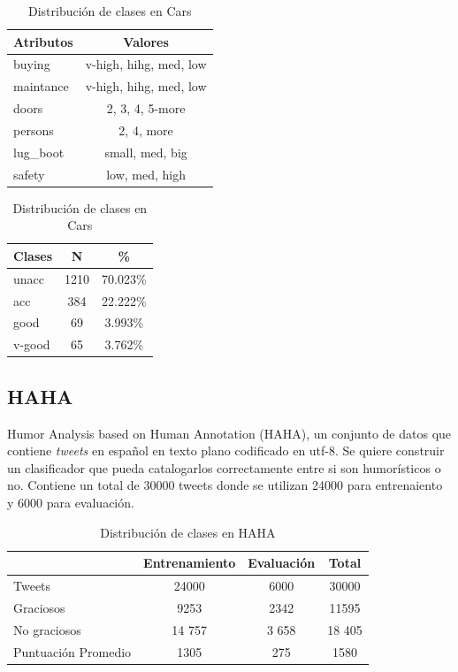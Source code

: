\begin{table}[ht]
    \centering
    \parbox{.45\linewidth}{
    \begin{tabular} { |l|c| }
        \hline
        Atributos & Valores \\
        \hline
        \hline
        buying & v-high, hihg, med, low \\
        \hline
        maintance &  v-high, hihg, med, low\\
        \hline
        doors & 2, 3, 4, 5-more\\
        \hline
        persons & 2, 4, more\\
        \hline
        lug\_boot & small, med, big\\
        \hline
        safety & low, med, high\\
        \hline
    \end{tabular}
    \caption{Tipos de Atributos en Cars}
    \label{implementation:table:cars:attributes}
    }
    \qquad
    \parbox[t]{.45\linewidth}{
    \begin{tabular} {|l|c|c|}
        \hline
        Clases & N & \% \\
        \hline
        \hline
        unacc & 1210 & 70.023\%\\
        \hline
        acc & 384 & 22.222\%\\
        \hline
        good & 69 & 3.993\%\\
        \hline
        v-good & 65 & 3.762\%\\
        \hline
    \end{tabular}
    \caption{Distribuci\'on de clases en Cars}
    \label{implementation:table:cars:classes}
    }
\end{table}

\subsection{HAHA}
Humor Analysis based on Human Annotation (HAHA), un conjunto de datos que contiene \textit{tweets} en espa\~nol en texto plano codificado en utf-8. Se quiere construir un clasificador que pueda catalogarlos correctamente entre si son humor\'isticos o no. Contiene un total de 30000 tweets donde se utilizan 24000 para entrenaiento y 6000 para evaluaci\'on.

\begin{table}[ht]
    \centering
    \begin{tabular} {|l||c|c|c|}
        \hline
        & Entrenamiento & Evaluaci\'on & Total \\
        \hline
        \hline
        Tweets & 24000 & 6000 & $30000$\\
        \hline
        Graciosos & 9253 & 2342 & 11595\\
        \hline
        No graciosos & 14 757 & 3 658 & 18 405\\
        \hline
        Puntuaci\'on Promedio & 1305 & 275 & 1580\\
        \hline
    \end{tabular}
    \caption{Distribuci\'on de clases en HAHA}
    \label{implementation:table:haha}
\end{table}

